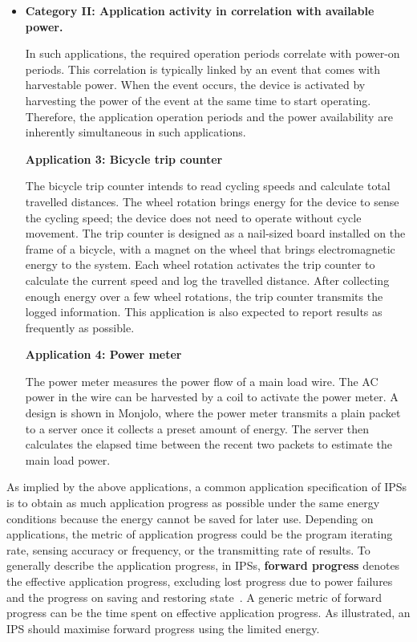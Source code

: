 \begin{itemize}
\item \textbf{Category II: Application activity in correlation with available power.}

In such applications, the required operation periods correlate with power-on periods. 
This correlation is typically linked by an event that comes with harvestable power. 
When the event occurs, the device is activated by harvesting the power of the event at the same time to start operating. 
Therefore, the application operation periods and the power availability are inherently simultaneous in such applications. 

\textbf{Application 3: Bicycle trip counter~\cite{bing2018energy}}

The bicycle trip counter intends to read cycling speeds and calculate total travelled distances. 
The wheel rotation brings energy for the device to sense the cycling speed; the device does not need to operate without cycle movement. 
The trip counter is designed as a nail-sized board installed on the frame of a bicycle, with a magnet on the wheel that brings electromagnetic energy to the system. 
Each wheel rotation activates the trip counter to calculate the current speed and log the travelled distance. 
After collecting enough energy over a few wheel rotations, the trip counter transmits the logged information. 
This application is also expected to report results as frequently as possible. 

\textbf{Application 4: Power meter~\cite{debruin2013monjolo}}

The power meter measures the power flow of a main load wire. 
The AC power in the wire can be harvested by a coil to activate the power meter. 
A design is shown in Monjolo, where the power meter transmits a plain packet to a server once it collects a preset amount of energy. 
The server then calculates the elapsed time between the recent two packets to estimate the main load power. 

\end{itemize}

As implied by the above applications, a common application specification of IPSs is to obtain as much application progress as possible under the same energy conditions because the energy cannot be saved for later use. 
Depending on applications, the metric of application progress could be the program iterating rate, sensing accuracy or frequency, or the transmitting rate of results. 
To generally describe the application progress, in IPSs, \textbf{forward progress} denotes the effective application progress, excluding lost progress due to power failures and the progress on saving and restoring state~\cite{7478428}.
A generic metric of forward progress can be the time spent on effective application progress. 
As illustrated, an IPS should maximise forward progress using the limited energy. 


